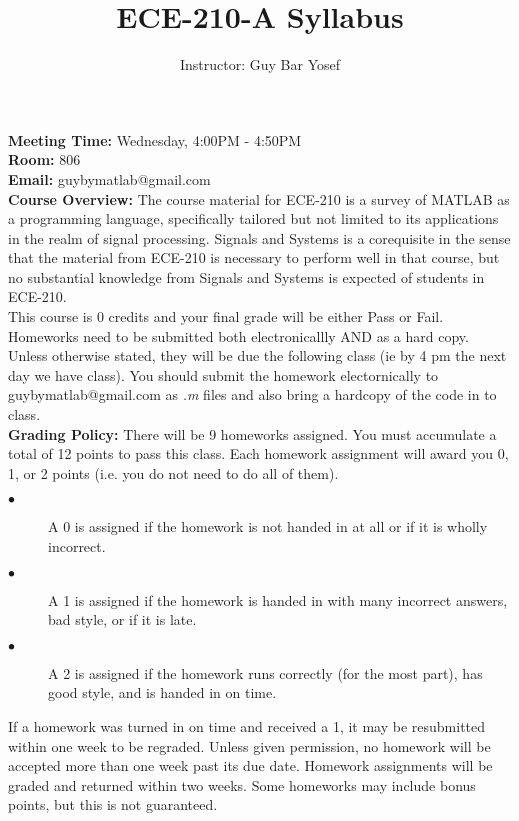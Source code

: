 \documentclass[12pt]{article}
\begin{document}

\title{ECE-210-A Syllabus}
\date{}
\author{Instructor: Guy Bar Yosef}
\maketitle

\textbf{Meeting Time:} Wednesday, 4:00PM - 4:50PM \\
\textbf{Room:} 806 \\
\textbf{Email:} guybymatlab@gmail.com \\

\textbf{Course Overview:}
The course material for ECE-210 is a survey of 
MATLAB as a programming language, specifically tailored but not 
limited to its applications in the realm of signal processing. 
Signals and Systems is a corequisite in the sense that the material 
from ECE-210 is necessary to perform well in that course, but no substantial 
knowledge from Signals and Systems is expected of students in ECE-210. \\
 
This course is 0 credits and your final grade will be either Pass or Fail.
Homeworks need to be submitted both electronicallly AND as a hard copy.
Unless otherwise stated, they will be due the following class 
(ie by 4 pm the next day we have class).
You should submit the homework electornically to guybymatlab@gmail.com as 
\textit{.m} files and also bring a hardcopy of the code in to class. 
\\

\textbf{Grading Policy:}
There will be 9 homeworks assigned. 
You must accumulate a total of 12 points to pass this class.
Each homework assignment will award you 0, 1, or 2 points
(i.e. you do not need to do all of them).
\begin{description}
    \item [$\bullet$]A 0 is assigned if the homework is not handed 
    in at all or if it is wholly incorrect.
    \item [$\bullet$]A 1 is assigned if the homework is handed
    in with many incorrect answers, bad style, or if it is late.
    \item [$\bullet$]A 2 is assigned if the homework runs correctly
    (for the most part), has good style, and is handed in on time.
\end{description} 
If a homework was turned in on time and received a 1,
it may be resubmitted within one week to be regraded.
Unless given permission, no homework will be accepted more than one 
week past its due date. 
Homework assignments will be graded and returned within two weeks.
Some homeworks may include bonus points, but this is not guaranteed.
\\
\end{document}
